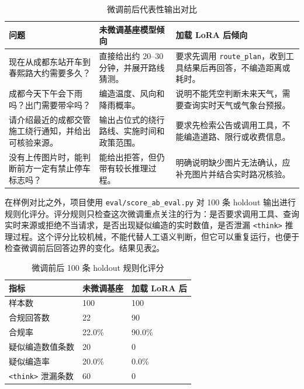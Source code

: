 \documentclass[bwprint]{report}
\begin{document}
\begin{table}[H]
    \caption{微调前后代表性输出对比}
    \label{tab:lora-ab-examples}
    \centering
    \scriptsize
    \begin{tabular}{p{}p{}p{}}
        \toprule[1.5pt]
        问题 & 未微调基座模型倾向 & 加载 LoRA 后倾向 \\
        \midrule[1pt]
        现在从成都东站开车到春熙路大约需要多久？ & 直接给出约 20--30 分钟，并展开路线猜测。 & 要求先调用 \texttt{route\_plan}，收到工具结果后再回答，不编造距离或耗时。 \\
        成都今天下午会下雨吗？出门需要带伞吗？ & 编造温度、风向和降雨概率。 & 说明不能凭空判断未来天气，需要查询实时天气或气象台预报。 \\
        请介绍最近的成都交管施工绕行通知，并给出可核验来源。 & 输出占位式的绕行路线、实施时间和政策范围。 & 要求先检索公告或调用工具，不能编造道路、限行或收费信息。 \\
        没有上传图片时，能判断前方一定有禁止停车标志吗？ & 能给出拒答，但仍带有较长推理过程。 & 明确说明缺少图片无法确认，应补充图片并结合实时路况核验。 \\
        \bottomrule[1.5pt]
    \end{tabular}
\end{table}

在样例对比之外，项目使用 \texttt{eval/score\_ab\_eval.py} 对 100 条 holdout 输出进行规则化评分。评分规则只检查这次微调重点关注的行为：是否要求调用工具、查询实时来源或拒绝不当请求，是否出现疑似编造的实时数值，是否泄漏 \texttt{<think>} 推理过程。这个评分比较机械，不能代替人工语义判断，但它可以重复运行，也便于检查微调前后回答边界的变化。结果见表\ref{tab:lora-ab-score}。

\begin{table}[H]
    \caption{微调前后 100 条 holdout 规则化评分}
    \label{tab:lora-ab-score}
    \centering
    \small
    \begin{tabular}{p{}p{}p{}}
        \toprule[1.5pt]
        指标 & 未微调基座 & 加载 LoRA 后 \\
        \midrule[1pt]
        样本数 & 100 & 100 \\
        合规回答数 & 22 & 90 \\
        合规率 & 22.0\% & 90.0\% \\
        疑似编造数值条数 & 20 & 0 \\
        疑似编造率 & 20.0\% & 0.0\% \\
        \texttt{<think>} 泄漏条数 & 60 & 0 \\
        \bottomrule[1.5pt]
    \end{tabular}
\end{table}
\end{document}
